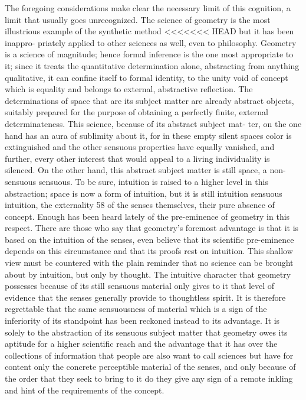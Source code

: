 The foregoing considerations make clear
the necessary limit of this cognition,
a limit that usually goes unrecognized.
The science of geometry is the
most illustrious example of the synthetic method
<<<<<<< HEAD
but it has been inappro-
priately applied to other sciences as well, even to philosophy. Geometry is
a science of magnitude; hence formal inference is the one most appropriate
to it; since it treats the quantitative determination alone, abstracting from
anything qualitative, it can confine itself to formal identity, to the unity void
of concept which is equality and belongs to external, abstractive reflection.
The determinations of space that are its subject matter are already abstract
objects, suitably prepared for the purpose of obtaining a perfectly finite,
external determinateness. This science, because of its abstract subject mat-
ter, on the one hand has an aura of sublimity about it, for in these empty
silent spaces color is extinguished and the other sensuous properties have
equally vanished, and further, every other interest that would appeal to a
living individuality is silenced. On the other hand, this abstract subject
matter is still space, a non-sensuous sensuous. To be sure, intuition is raised
to a higher level in this abstraction; space is now a form of intuition,
but it is still intuition
sensuous intuition, the externality 58 of the senses
themselves, their pure absence of concept.
Enough has been heard lately
of the pre-eminence of geometry in this respect. There are those who say
that geometry's foremost advantage is that it is based on the intuition of
the senses, even believe that its scientific pre-eminence depends on this
circumstance and that its proofs rest on intuition. This shallow view must
be countered with the plain reminder that no science can be brought about
by intuition, but only by thought. The intuitive character that geometry
possesses because of its still sensuous material only gives to it that level of
evidence that the senses generally provide to thoughtless spirit. It is therefore
regrettable that the same sensuousness of material which is a sign of the
inferiority of its standpoint has been reckoned instead to its advantage. It is
solely to the abstraction of its sensuous subject matter that geometry owes
its aptitude for a higher scientific reach and the advantage that it has over
the collections of information that people are also want to call sciences but
have for content only the concrete perceptible material of the senses, and
only because of the order that they seek to bring to it do they give any sign
of a remote inkling and hint of the requirements of the concept.

